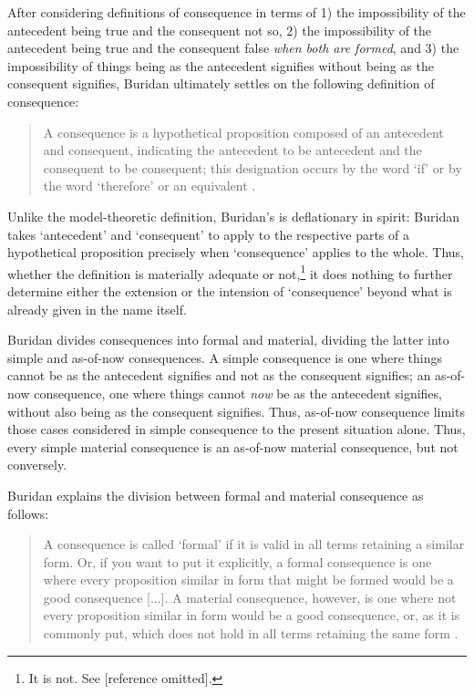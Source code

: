 \documentclass[]{article}
\begin{document}
After considering definitions of consequence in terms of 1) the impossibility of the antecedent being true and the consequent not so, 2) the impossibility of the antecedent being true and the consequent false \textit{when both are formed}, and 3) the impossibility of things being as the antecedent signifies without being as the consequent signifies, Buridan ultimately settles on the following definition of consequence: 

\begin{quote}
	A consequence is a hypothetical proposition composed of an antecedent and consequent, indicating the antecedent to be antecedent and the consequent to be consequent; this designation occurs by the word `if' or by the word `therefore' or an equivalent \autocite[I. 3, 67]{Buridan2015}.
\end{quote}

Unlike the model-theoretic definition, Buridan's is deflationary in spirit: Buridan takes `antecedent' and `consequent' to apply to the respective parts of a hypothetical proposition precisely when `consequence' applies to the whole. Thus, whether the definition is materially adequate or not,\footnote{It is not. See [reference omitted].} it does nothing to further determine either the extension or the intension of `consequence' beyond what is already given in the name itself.



Buridan divides consequences into formal and material, dividing the latter into simple and as-of-now consequences. A simple consequence is one where things cannot be as the antecedent signifies and not as the consequent signifies; an as-of-now consequence, one where things cannot \textit{now} be as the antecedent signifies, without also being as the consequent signifies. Thus, as-of-now consequence limits those cases considered in simple consequence to the present situation alone. Thus, every simple material consequence is an as-of-now material consequence, but not conversely. 

Buridan explains the division between formal and material consequence as follows: 
\begin{quote}
	A consequence is called `formal' if it is valid in all terms retaining a similar form. Or, if you want to put it explicitly, a formal consequence is one where every proposition similar in form that might be formed would be a good consequence [...]. A material consequence, however, is one where not every proposition similar in form would be a good consequence, or, as it is commonly put, which does not hold in all terms retaining the same form \autocite[I. 4, 68]{Buridan2015}.
\end{quote}
\end{document}
